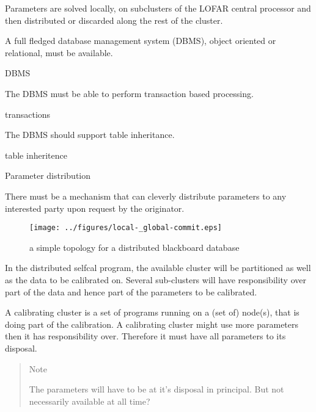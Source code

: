 \documentclass[]{lofar}
\begin{document}
      Parameters are solved locally, on subclusters of the LOFAR
      central processor and then distributed or discarded along the
      rest of the cluster.

      \begin{prerequisite}
        A full fledged database management system (DBMS),
        object oriented or relational, must be available.
        \caption{DBMS\label{pre:dbms}}
      \end{prerequisite}

      \begin{prerequisite}
        The DBMS must be able to perform transaction based processing.
        \caption{transactions\label{pre:transactions}}
      \end{prerequisite}

      \begin{prerequisite}
        The DBMS should support table inheritance.
        \caption{table inheritence\label{pre:table-inheritance}}
      \end{prerequisite}

      \begin{requirement}
        \caption{Parameter distribution\label{req:parameter-distribution}}
        There must be a mechanism that can cleverly distribute
        parameters to any interested party upon request by the
        originator.
      \end{requirement}

      \begin{figure}
        \texttt{[image: ../figures/local-\_global-commit.eps]}
        \hypertarget{fig:localGlobalCommit}{}
        \caption{a simple topology for a distributed blackboard database\label{fig:localGlobalCommit}}
      \end{figure}

      In the distributed selfcal program, the available cluster will
      be partitioned as well as the data to be calibrated on. Several
      sub-clusters will have responsibility over part of the data and
      hence part of the parameters to be calibrated.

      A calibrating cluster is a set of programs running on a (set of)
      node(s), that is doing part of the calibration.  A calibrating
      cluster might use more parameters then it has responsibility
      over. Therefore it must have all parameters to its
      disposal.

      \begin{verse}{Note}

        The parameters will have to be at it's disposal in
        principal. But not necessarily available at all time?

      \end{verse}
\end{document}
